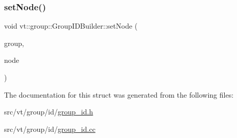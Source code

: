 \subsubsection{\texorpdfstring{set\+Node()}{setNode()}}
{\footnotesize\ttfamily void vt\+::group\+::\+Group\+I\+D\+Builder\+::set\+Node (\begin{DoxyParamCaption}\item[{\hyperlink{namespacevt_a27b5e4411c9b6140c49100e050e2f743}{Group\+Type} \&}]{group,  }\item[{\hyperlink{namespacevt_a866da9d0efc19c0a1ce79e9e492f47e2}{Node\+Type} const \&}]{node }\end{DoxyParamCaption})\hspace{0.3cm}{\ttfamily [static]}}



The documentation for this struct was generated from the following files\+:\begin{DoxyCompactItemize}
\item 
src/vt/group/id/\hyperlink{group__id_8h}{group\+\_\+id.\+h}\item 
src/vt/group/id/\hyperlink{group__id_8cc}{group\+\_\+id.\+cc}\end{DoxyCompactItemize}
